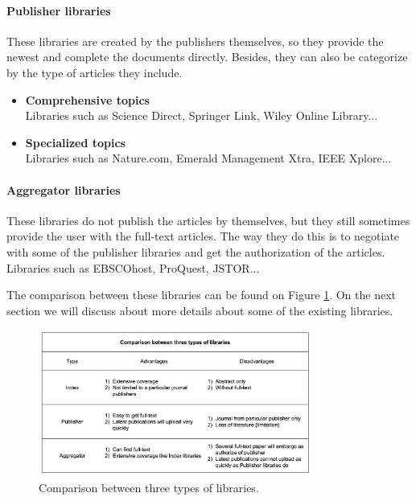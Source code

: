 \paragraph{Publisher libraries}
	These libraries are created by the publishers themselves, so they provide the newest and complete the documents directly.
	Besides, they can also be categorize by the type of articles they include.
	
	\begin{itemize}		
		\item\textbf{Comprehensive topics}\\Libraries such as Science Direct, Springer Link, Wiley Online Library...
		\item\textbf{Specialized topics}\\Libraries such as Nature.com, Emerald Management Xtra, IEEE Xplore...	
	\end{itemize}
	
\paragraph{Aggregator libraries}
	These libraries do not publish the articles by themselves, but they still sometimes provide the user with the full-text articles.
	The way they do this is to negotiate with some of the publisher libraries and get the authorization of the articles.
	Libraries such as EBSCOhost, ProQuest, JSTOR...

	The comparison between these libraries can be found on Figure \ref{WBC1}.
	On the next section we will discuss about more details about some of the existing libraries.

\begin{figure}[htb]
	\begin{center}
		\includegraphics[width=0.8\textwidth]{Wolverine_Background_Chart_1}
	\end{center}
	\caption{Comparison between three types of libraries.\label{WBC1}}
\end{figure}
\newpage

